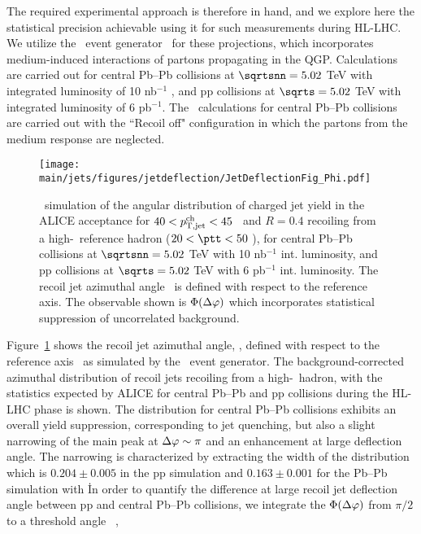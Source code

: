 The required experimental approach is therefore in hand, and we explore here the statistical precision achievable using it for such measurements during HL-LHC.
We utilize the \jewel\ event generator~\cite{Zapp:2013vla} for these projections, which incorporates medium-induced interactions of partons propagating in the QGP. Calculations are carried out for central Pb--Pb collisions at $\sqrtsnn=5.02$ TeV with integrated luminosity of 10 nb$^{-1}$ , and pp collisions at $\sqrts=5.02$ TeV with integrated luminosity of 6 pb$^{-1}$. 
The \jewel\ calculations for central Pb--Pb collisions are carried out with the ``Recoil off" configuration in which the partons from the medium response are neglected. %

\begin{figure}[tbh!]
\centering
\texttt{[image: \\main/jets/figures/jetdeflection/JetDeflectionFig\_Phi.pdf]}
\caption{\jewel\ simulation of the angular distribution of charged jet yield in the ALICE acceptance for  $40<p_{\mathrm{T,jet}}^{\mathrm{ch}}<45$ \gevc\ and $R=0.4$ recoiling from a high-\pt\ reference hadron ($20<\ptt<50$ \gevc), for central Pb--Pb collisions at $\sqrtsnn=5.02$ TeV with 10 nb$^{-1}$ int. luminosity, and pp collisions at $\sqrts=5.02$ TeV with 6 pb$^{-1}$ int. luminosity. The recoil jet azimuthal angle \Dphi\ is defined with respect to the reference axis. The observable shown is $\Phi(\Delta\varphi)$ which incorporates statistical suppression of uncorrelated background.
}
\label{fig:JetDeflectionPhi}
\end{figure}

Figure~\ref{fig:JetDeflectionPhi} shows the recoil jet azimuthal angle, \Dphi, defined with respect to the reference axis~\cite{Adam:2015doa} as simulated by the \jewel\ event generator. The background-corrected azimuthal distribution of recoil jets recoiling from a high-\pT\ hadron, with the statistics expected by ALICE for central Pb--Pb and pp collisions during the HL-LHC phase is shown. The distribution for central Pb--Pb collisions exhibits an overall yield suppression, corresponding to jet quenching, but also a slight narrowing of the main peak at $\Delta\varphi\sim\pi$ and an enhancement at large deflection angle. The narrowing is characterized by extracting the width of the \Dphi distribution which is $0.204 \pm 0.005$ in the pp simulation and $0.163 \pm 0.001$ for the Pb--Pb simulation with \jewel\. 
In order to quantify the difference at large recoil jet deflection angle between pp and central Pb--Pb collisions, we integrate the $\Phi(\Delta\varphi)$ from $\pi/2$ to a threshold angle \dphithresh~\cite{Adam:2015doa},

